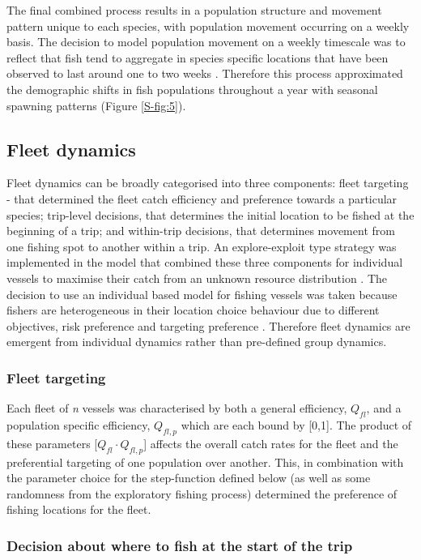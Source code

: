 \documentclass[review]{elsarticle}
\begin{document}
The final combined process results in a population structure and movement
pattern unique to each species, with population movement occurring on a weekly
basis. The decision to model population movement on a weekly timescale was to
reflect that fish tend to aggregate in species specific locations that have
been observed to last around one to two weeks \citep{Poos2007}. Therefore this
process approximated the demographic shifts in fish populations throughout a
year with seasonal spawning patterns (Figure \ref{S-fig:5}).

\subsection{Fleet dynamics}

Fleet dynamics can be broadly categorised into three components: fleet
targeting - that determined the fleet catch efficiency and preference towards a
particular species; trip-level decisions, that determines the initial location
to be fished at the beginning of a trip; and within-trip decisions, that
determines movement from one fishing spot to another within a trip. An
explore-exploit type strategy was implemented in the model that combined these
three components for individual vessels to maximise their catch from an unknown
resource distribution \citep{Bailey2018}. The decision to use an individual
based model for fishing vessels was taken because fishers are heterogeneous in
their location choice behaviour due to different objectives, risk preference
and targeting preference \citep{VanPutten2012a, Boonstra2015}. Therefore fleet
dynamics are emergent from individual dynamics rather than pre-defined group
dynamics. 

\subsubsection{Fleet targeting}

Each fleet of \textit{n} vessels was characterised by both a general
efficiency, $Q_{fl}$, and a population specific efficiency, ${Q_{fl, p}}$ which
are each bound by [0,1]. The product of these parameters [$Q_{fl} \cdot
Q_{fl, p}$] affects the overall catch rates for the fleet and the preferential
targeting of one population over another. This, in combination with the
parameter choice for the step-function defined below (as well as some
randomness from the exploratory fishing process) determined the preference of
fishing locations for the fleet.  

\subsubsection{Decision about where to fish at the start of the trip}
\end{document}
